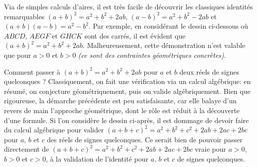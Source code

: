 Via de simples calculs d'aires, il est très facile de découvrir les classiques identités remarquables
$(a + b)^2 = a^2 + b^2 + 2ab$,
$(a - b)^2 = a^2 + b^2 - 2ab$
et
$(a + b)(a - b) = a^2 - b^2$.
%
Par exemple, en considérant le dessin ci-dessous où $ABCD$, $AEGF$ et $GHCK$ sont des carrés,
il est évident que $(a + b)^2 = a^2 + b^2 + 2 ab$.
Malheureusement, cette démonstration n'est valable que pour $a > 0$ et $b > 0$ \emph{(ce sont des contraintes géométriques concrètes)}.

\begin{center}
\end{center}


Comment passer à $(a + b)^2 = a^2 + b^2 + 2 ab$ pour $a$ et $b$ deux réels de signes quelconques ?
Classiquement, on fait une vérification via un calcul algébrique: en résumé, on conjecture géométriquement, puis on valide algébriquement.
%
Bien que rigoureuse, la démarche précédente est peu satisfaisante, car elle balaye d'un revers de main l'approche géométrique, dont le rôle est réduit à la découverte d'une formule.
Si l'on considère le dessin ci-après, il est dommage de devoir faire du calcul algébrique pour valider $(a + b + c)^2 = a^2 + b^2 + c^2 + 2 ab + 2 ac + 2 bc$ pour $a$, $b$ et $c$ des réels de signes quelconques.
Ce serait bien de pouvoir passer directement de $(a + b + c)^2 = a^2 + b^2 + c^2 + 2 ab + 2 ac + 2 bc$ vraie pour $a > 0$, $b > 0$ et $c > 0$, à la validation de l'identité pour $a$, $b$ et $c$ de signes quelconques.

\begin{center}
\end{center}

